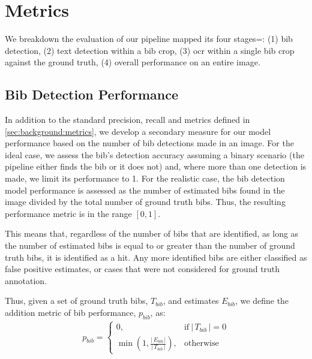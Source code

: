\section{Metrics}
\label{sec:evaluation:metrics}

We breakdown the evaluation of our pipeline mapped its four stages=: (1) bib detection, (2) text detection within a bib crop, (3) \gls{ocr} within a single bib crop against the ground truth, (4) overall performance on an entire image.

\subsection{Bib Detection Performance}
\label{sec:evaluation:metrics:bib}


In addition to the standard precision, recall and \fscore{} metrics defined in \cref{sec:background:metrics}, we develop a secondary measure for our model performance based on the number of bib detections made in an image. For the ideal case, we assess the bib's detection accuracy assuming a binary scenario (the pipeline either finds the bib or it does not) and, where more than one detection is made, we limit its performance to 1. For the realistic case, the bib detection model performance is assessed as the number of estimated bibs found in the image divided by the total number of ground truth bibs. Thus, the resulting performance metric is in the range $[0, 1]$.

This means that, regardless of the number of bibs that are identified, as long as the number of estimated bibs is equal to or greater than the number of ground truth bibs, it is identified as a hit. Any more identified bibs are either classified as false positive estimates, or cases that were not considered for ground truth annotation.

Thus, given a set of ground truth bibs, $T_{bib}$, and estimates $E_{bib}$, we define the addition metric of bib performance, $p_{bib}$, as:
\begin{align*}
  p_{bib} =
  \begin{cases}
    0,                                          & \textrm{if}\ \lvert\,T_{bib}\,\rvert = 0\\
    \min\left(1, \frac{\lvert\,E_{bib}\,\rvert}{\lvert\,T_{bib}\,\rvert}\right), & \textrm{otherwise}
  \end{cases}
\end{align*}

